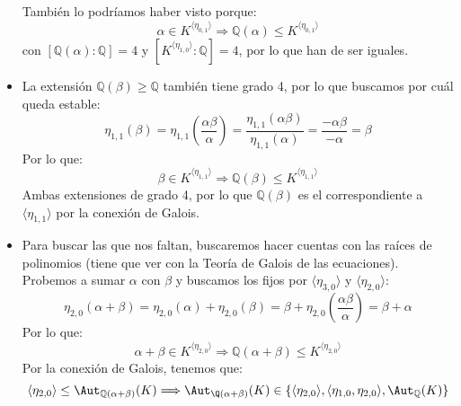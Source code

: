 \begin{ejemplo}
\begin{itemize}
            También lo podríamos haber visto porque:
            \begin{equation*}
                \alpha\in K^{\langle \eta_{0,1} \rangle } \Longrightarrow \mathbb{Q}(\alpha)\leq K^{\langle \eta_{0,1} \rangle }
            \end{equation*}
            con $[\mathbb{Q}(\alpha):\mathbb{Q}] = 4$ y $[K^{\langle \eta_{1,0} \rangle }:\mathbb{Q}] = 4$, por lo que han de ser iguales.
        \item La extensión $\mathbb{Q}(\beta)\geq \mathbb{Q}$ también tiene grado 4, por lo que buscamos por cuál queda estable:
            \begin{equation*}
                \eta_{1,1}(\beta) = \eta_{1,1}\left(\frac{\alpha\beta}{\alpha}\right) = \frac{\eta_{1,1}(\alpha\beta)}{\eta_{1,1}(\alpha)} = \frac{-\alpha\beta}{-\alpha} = \beta
            \end{equation*}
            Por lo que:
            \begin{equation*}
                \beta\in K^{\langle \eta_{1,1} \rangle } \Longrightarrow \mathbb{Q}(\beta) \leq K^{\langle \eta_{1,1} \rangle }
            \end{equation*}
            Ambas extensiones de grado 4, por lo que $\mathbb{Q}(\beta)$ es el correspondiente a $\langle \eta_{1,1} \rangle $ por la conexión de Galois.
        \item Para buscar las que nos faltan, buscaremos hacer cuentas con las raíces de polinomios (tiene que ver con la Teoría de Galois de las ecuaciones). Probemos a sumar $\alpha$ con $\beta$ y buscamos los fijos por $\langle \eta_{3,0} \rangle $ y $\langle \eta_{2,0} \rangle $:
            \begin{equation*}
                \eta_{2,0}(\alpha+\beta) = \eta_{2,0}(\alpha) + \eta_{2,0}(\beta) = \beta + \eta_{2,0}\left(\frac{\alpha\beta}{\alpha}\right) = \beta + \alpha
            \end{equation*}
            Por lo que:
            \begin{equation*}
                \alpha + \beta \in K^{\langle \eta_{2,0} \rangle } \Longrightarrow \mathbb{Q}(\alpha+\beta)\leq K^{\langle \eta_{2,0} \rangle }
            \end{equation*}
            Por la conexión de Galois, tenemos que:
            \begin{equation*}
                \langle \eta_{2,0} \rangle  \leq \Aut_{\mathbb{Q}(\alpha+\beta)}(K) \Longrightarrow \Aut_{\Q(\alpha+\beta)}(K) \in \{\langle \eta_{2,0} \rangle, \langle \eta_{1,0},\eta_{2,0} \rangle, \Aut_\mathbb{Q}(K)  \}

\end{equation*}
\end{itemize}
\end{ejemplo}
